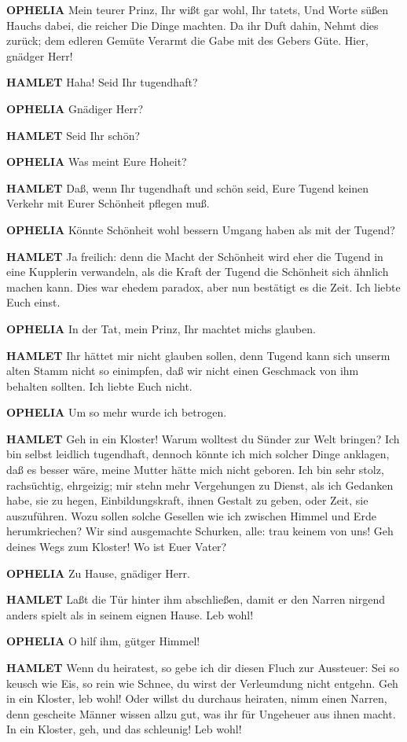 \documentclass[11pt,a4paper]{scrreprt}
\begin{document}
\textbf{OPHELIA}
Mein teurer Prinz, Ihr wißt gar wohl, Ihr tatets,
Und Worte süßen Hauchs dabei, die reicher
Die Dinge machten. Da ihr Duft dahin,
Nehmt dies zurück; dem edleren Gemüte
Verarmt die Gabe mit des Gebers Güte.
Hier, gnädger Herr!

\textbf{HAMLET}
Haha! Seid Ihr tugendhaft?

\textbf{OPHELIA}
Gnädiger Herr?

\textbf{HAMLET}
Seid Ihr schön?

\textbf{OPHELIA}
Was meint Eure Hoheit?

\textbf{HAMLET}
Daß, wenn Ihr tugendhaft und schön seid, Eure Tugend keinen Verkehr mit Eurer
Schönheit pflegen muß.

\textbf{OPHELIA}
Könnte Schönheit wohl bessern Umgang haben als mit der Tugend?

\textbf{HAMLET}
Ja freilich: denn die Macht der Schönheit wird eher die Tugend in eine
Kupplerin verwandeln, als die Kraft der Tugend die Schönheit sich ähnlich
machen kann. Dies war ehedem paradox, aber nun bestätigt es die Zeit. Ich
liebte Euch einst.

\textbf{OPHELIA}
In der Tat, mein Prinz, Ihr machtet michs glauben.

\textbf{HAMLET}
Ihr hättet mir nicht glauben sollen, denn Tugend kann sich unserm alten Stamm
nicht so einimpfen, daß wir nicht einen Geschmack von ihm behalten sollten. Ich
liebte Euch nicht.

\textbf{OPHELIA}
Um so mehr wurde ich betrogen.

\textbf{HAMLET}
Geh in ein Kloster! Warum wolltest du Sünder zur Welt bringen? Ich bin selbst
leidlich tugendhaft, dennoch könnte ich mich solcher Dinge anklagen, daß es
besser wäre, meine Mutter hätte mich nicht geboren. Ich bin sehr stolz,
rachsüchtig, ehrgeizig; mir stehn mehr Vergehungen zu Dienst, als ich Gedanken
habe, sie zu hegen, Einbildungskraft, ihnen Gestalt zu geben, oder Zeit, sie
auszuführen. Wozu sollen solche Gesellen wie ich zwischen Himmel und Erde
herumkriechen? Wir sind ausgemachte Schurken, alle: trau keinem von uns! Geh
deines Wegs zum Kloster! Wo ist Euer Vater?

\textbf{OPHELIA}
Zu Hause, gnädiger Herr.

\textbf{HAMLET}
Laßt die Tür hinter ihm abschließen, damit er den Narren nirgend anders spielt
als in seinem eignen Hause. Leb wohl!

\textbf{OPHELIA}
O hilf ihm, gütger Himmel!

\textbf{HAMLET}
Wenn du heiratest, so gebe ich dir diesen Fluch zur Aussteuer: Sei so keusch
wie Eis, so rein wie Schnee, du wirst der Verleumdung nicht entgehn. Geh in ein
Kloster, leb wohl! Oder willst du durchaus heiraten, nimm einen Narren, denn
gescheite Männer wissen allzu gut, was ihr für Ungeheuer aus ihnen macht. In
ein Kloster, geh, und das schleunig! Leb wohl!
\end{document}
